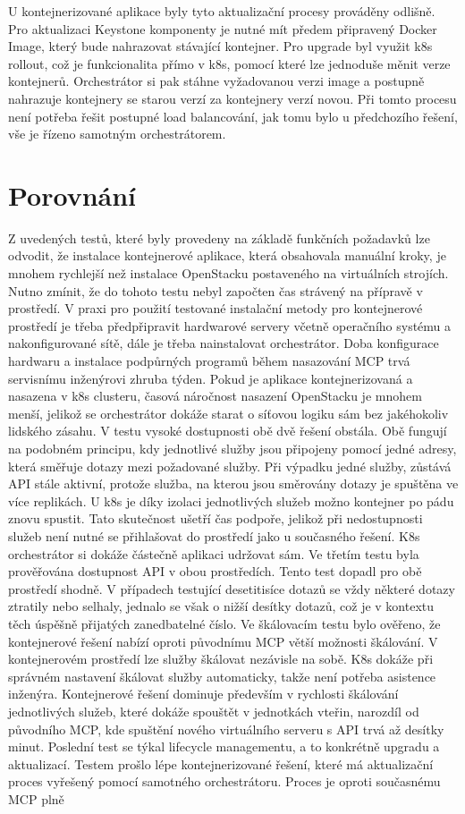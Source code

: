 U kontejnerizované aplikace byly tyto aktualizační procesy prováděny odlišně. Pro aktualizaci Keystone komponenty je nutné mít předem připravený Docker Image, který bude nahrazovat stávající kontejner. Pro upgrade byl využit k8s rollout, což je funkcionalita přímo v k8s, pomocí které lze jednoduše měnit verze kontejnerů. Orchestrátor si pak stáhne vyžadovanou verzi image a postupně nahrazuje kontejnery se starou verzí za kontejnery verzí novou. Při tomto procesu není potřeba řešit postupné load balancování, jak tomu bylo u předchozího řešení, vše je řízeno samotným orchestrátorem.

\section{Porovnání}
Z uvedených testů, které byly provedeny na základě funkčních požadavků lze odvodit, že instalace kontejnerové aplikace, která obsahovala manuální kroky, je mnohem rychlejší než instalace OpenStacku postaveného na virtuálních strojích. Nutno zmínit, že do tohoto testu nebyl započten čas strávený na přípravě v prostředí. V praxi pro použití testované instalační metody pro kontejnerové prostředí je třeba předpřipravit hardwarové servery včetně operačního systému a nakonfigurované sítě, dále je třeba nainstalovat orchestrátor. Doba konfigurace hardwaru a instalace podpůrných programů během nasazování MCP trvá servisnímu inženýrovi zhruba týden. Pokud je aplikace kontejnerizovaná a nasazena v k8s clusteru, časová náročnost nasazení OpenStacku je mnohem menší, jelikož se orchestrátor dokáže starat o síťovou logiku sám bez jakéhokoliv lidského zásahu. V testu vysoké dostupnosti obě dvě řešení obstála. Obě fungují na podobném principu, kdy jednotlivé služby jsou připojeny pomocí jedné adresy, která směřuje dotazy mezi požadované služby. Při výpadku jedné služby, zůstává API stále aktivní, protože služba, na kterou jsou směrovány dotazy je spuštěna ve více replikách. U k8s je díky izolaci jednotlivých služeb možno kontejner po pádu znovu spustit. Tato skutečnost ušetří čas podpoře, jelikož při nedostupnosti služeb není nutné se přihlašovat do prostředí jako u současného řešení. K8s orchestrátor si dokáže částečně aplikaci udržovat sám. Ve třetím testu byla prověřována dostupnost API v obou prostředích. Tento test dopadl pro obě prostředí shodně. V případech testující desetitisíce dotazů se vždy některé dotazy ztratily nebo selhaly, jednalo se však o nižší desítky dotazů, což je v kontextu těch úspěšně přijatých zanedbatelné číslo. Ve škálovacím testu bylo ověřeno, že kontejnerové řešení nabízí oproti původnímu MCP větší možnosti škálování. V kontejnerovém prostředí lze služby škálovat nezávisle na sobě. K8s dokáže při správném nastavení škálovat služby automaticky, takže není potřeba asistence inženýra. Kontejnerové řešení dominuje především v rychlosti škálování jednotlivých služeb, které dokáže spouštět v jednotkách vteřin, narozdíl od původního MCP, kde spuštění nového virtuálního serveru s API trvá až desítky minut. Poslední test se týkal lifecycle managementu, a to konkrétně upgradu a aktualizací. Testem prošlo lépe kontejnerizované řešení, které má aktualizační proces vyřešený pomocí samotného orchestrátoru. Proces je oproti současnému MCP plně 